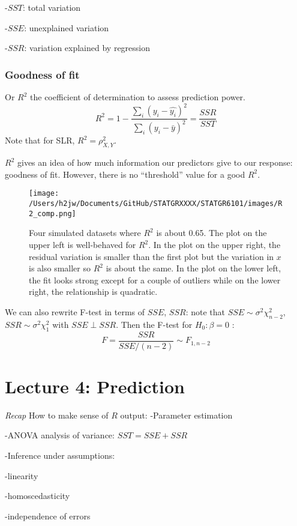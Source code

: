 \documentclass[
]{article}
\begin{document}
-\(SST\): total variation

-\(SSE\): unexplained variation

-\(SSR\): variation explained by regression

\hypertarget{goodness-of-fit}{%
\subsubsection{Goodness of fit}\label{goodness-of-fit}}

Or \(R^2\) the coefficient of determination to assess prediction power.
\[R^2=1-\frac{\sum_i (y_i-\hat{y_i})^2}{\sum_i (y_i-\bar{y})^2}=\frac{SSR}{SST}\]
Note that for SLR, \(R^2=\rho_{X,Y}^2\).

\(R^2\) gives an idea of how much information our predictors give to our
response: goodness of fit. However, there is no ``threshold'' value for
a good \(R^2\).

\begin{figure}
\centering
\texttt{[image: /Users/h2jw/Documents/GitHub/STATGRXXXX/STATGR6101/images/R2\_comp.png]}
\caption{Four simulated datasets where \(R^2\) is about 0.65. The plot
on the upper left is well-behaved for \(R^2\). In the plot on the upper
right, the residual variation is smaller than the first plot but the
variation in \(x\) is also smaller so \(R^2\) is about the same. In the
plot on the lower left, the fit looks strong except for a couple of
outliers while on the lower right, the relationship is quadratic.}
\end{figure}

We can also rewrite F-test in terms of \(SSE\), \(SSR\): note that
\(SSE\sim\sigma^2\chi_{n-2}^2\), \(SSR\sim\sigma^2\chi_1^2\) with
\(SSE\perp SSR\). Then the F-test for \(H_0 :\beta=0\) :
\[F=\frac{SSR}{SSE/(n-2)}\sim F_{1,n-2}\]

\hypertarget{lecture-4-prediction}{%
\section{Lecture 4: Prediction}\label{lecture-4-prediction}}

\emph{Recap} How to make sense of \(R\) output: -Parameter estimation

-ANOVA analysis of variance: \(SST=SSE+SSR\)

-Inference under assumptions:

-linearity

-homoscedasticity

-independence of errors
\end{document}
